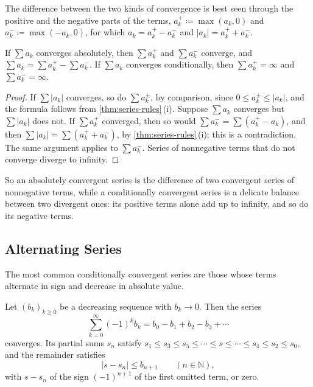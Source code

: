 The difference between the two kinds of convergence is best seen through the positive and the negative parts of the terms, $a_k^+\coloneqq\max(a_k,0)$ and $a_k^-\coloneqq\max(-a_k,0)$, for which $a_k=a_k^+-a_k^-$ and $|a_k|=a_k^++a_k^-$.

\begin{proposition}
\label{prop:positive-negative-parts}
If $\sum a_k$ converges absolutely, then $\sum a_k^+$ and $\sum a_k^-$ converge, and $\sum a_k=\sum a_k^+-\sum a_k^-$. If $\sum a_k$ converges conditionally, then $\sum a_k^+=\infty$ and $\sum a_k^-=\infty$.
\end{proposition}

\begin{proof}
If $\sum|a_k|$ converges, so do $\sum a_k^\pm$, by comparison, since $0\le a_k^\pm\le|a_k|$, and the formula follows from \cref{thm:series-rules}\,(i). Suppose $\sum a_k$ converges but $\sum|a_k|$ does not. If $\sum a_k^+$ converged, then so would $\sum a_k^-=\sum(a_k^+-a_k)$, and then $\sum|a_k|=\sum(a_k^++a_k^-)$, by \cref{thm:series-rules}\,(i); this is a contradiction. The same argument applies to $\sum a_k^-$. Series of nonnegative terms that do not converge diverge to infinity.
\end{proof}

So an absolutely convergent series is the difference of two convergent series of nonnegative terms, while a conditionally convergent series is a delicate balance between two divergent ones: its positive terms alone add up to infinity, and so do its negative terms.

\subsection{Alternating Series}

The most common conditionally convergent series are those whose terms alternate in sign and decrease in absolute value.

\begin{theorem}
\label{thm:leibniz}
Let $(b_k)_{k\ge0}$ be a decreasing sequence with $b_k\to0$. Then the series
\[
\sum_{k=0}^\infty(-1)^kb_k=b_0-b_1+b_2-b_3+\cdots
\]
converges. Its partial sums $s_n$ satisfy $s_1\le s_3\le s_5\le\cdots\le s\le\cdots\le s_4\le s_2\le s_0$, and the remainder satisfies
\[
|s-s_n|\le b_{n+1}\qquad(n\in\mathbb N),
\]
with $s-s_n$ of the sign $(-1)^{n+1}$ of the first omitted term, or zero.
\end{theorem}

